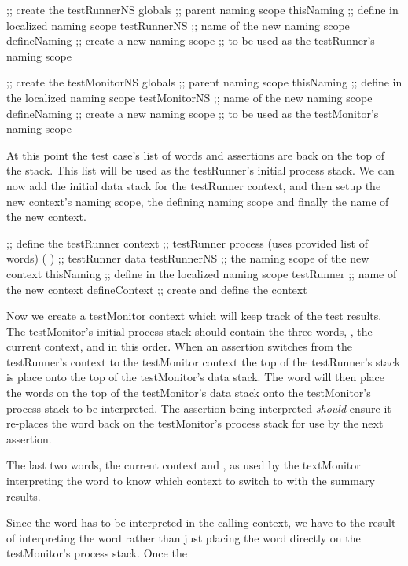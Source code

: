 \startJoylolCode
  ;; create the testRunnerNS
  globals      ;; parent naming scope
  thisNaming   ;; define in localized naming scope
  testRunnerNS ;; name of the new naming scope
  defineNaming ;; create a new naming scope
               ;; to be used as the testRunner's naming scope
\stopJoylolCode

\startJoylolCode
  ;; create the testMonitorNS
  globals       ;; parent naming scope
  thisNaming    ;; define in the localized naming scope
  testMonitorNS ;; name of the new naming scope
  defineNaming  ;; create a new naming scope
                ;; to be used as the testMonitor's naming scope
\stopJoylolCode

At this point the test case's list of words and assertions are back on the 
top of the stack. This list will be used as the testRunner's initial 
process stack. We can now add the initial data stack for the testRunner 
context, and then setup the new context's naming scope, the defining 
naming scope and finally the name of the new context.

\startJoylolCode
  ;; define the testRunner context
                ;; testRunner process (uses provided list of words)
  ( 
  )             ;; testRunner data
  testRunnerNS  ;; the naming scope of the new context
  thisNaming    ;; define in the localized naming scope
  testRunner    ;; name of the new context
  defineContext ;; create and define the context
\stopJoylolCode

Now we create a testMonitor context which will keep track of the test 
results. The testMonitor's initial process stack should contain the three 
words, , the current context, and  in this 
order. When an assertion switches from the testRunner's context to the 
testMonitor context the top of the testRunner's stack is place onto the 
top of the testMonitor's data stack. The  word will then 
place the words on the top of the testMonitor's data stack onto the 
testMonitor's process stack to be interpreted. The assertion being 
interpreted \emph{should} ensure it re-places the  word 
back on the testMonitor's process stack for use by the next assertion. 

The last two words, the current context and , as used by the 
textMonitor interpreting the  word to know which context to 
switch to with the summary results. 

Since the  word has to be interpreted in the calling 
context, we have to  the result of interpreting the 
 word rather than just placing the  
word directly on the testMonitor's process stack. Once the 

